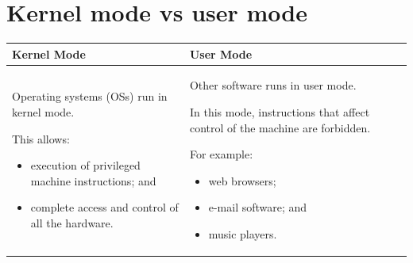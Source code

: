 \documentclass[a4paper]{systems-software}
\begin{document}
\section*{Kernel mode vs user mode}

\begin{longtabu} to \textwidth {| X[1,l] | X[1,l] |}
    \hline
    \textbf{Kernel Mode} & \textbf{User Mode}
    \\ \hline
    Operating systems (OSs) run in kernel mode.
    
    This allows:
    \begin{itemize}
    	\item execution of privileged machine instructions; and
    	\item complete access and control of all the hardware.
    \end{itemize}
    &
    Other software runs in user mode.

	In this mode, instructions that affect control of the machine are forbidden.

	For example:
	\begin{itemize}
		\item 	web browsers;
		\item e-mail software; and
		\item music players.
	\end{itemize}
	\\ \hline
\end{longtabu}
\end{document}
